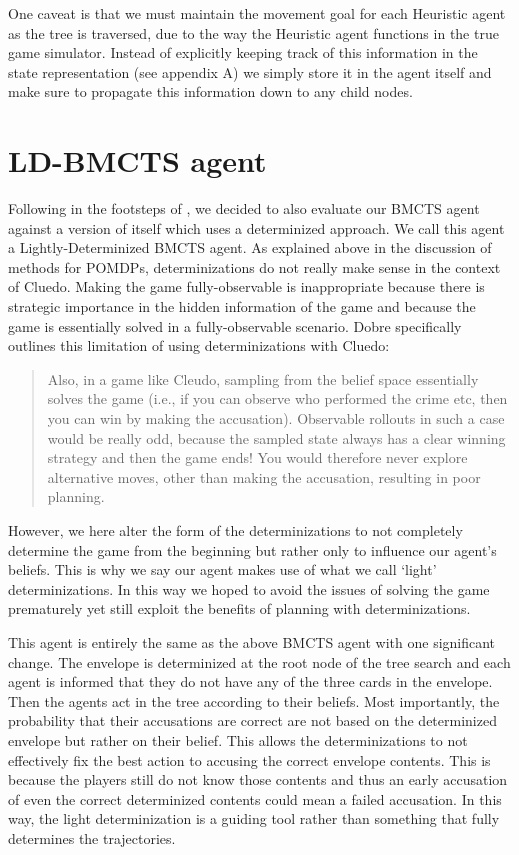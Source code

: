 \documentclass[msc, ai, twoside, notimes, logo, parskip, leftchapter, normalheadings]{infthesis}
\begin{document}
One caveat is that we must maintain the movement goal for each Heuristic agent as the tree is traversed, due to the way the Heuristic agent functions in the true game simulator. Instead of explicitly keeping track of this information in the state representation (see appendix A) we simply store it in the agent itself and make sure to propagate this information down to any child nodes.

\section{LD-BMCTS agent}
Following in the footsteps of \citep{Mihai}, we decided to also evaluate our BMCTS agent against a version of itself which uses a determinized approach. We call this agent a Lightly-Determinized BMCTS agent. As explained above in the discussion of methods for POMDPs, determinizations do not really make sense in the context of Cluedo. Making the game fully-observable is inappropriate because there is strategic importance in the hidden information of the game and because the game is essentially solved in a fully-observable scenario. Dobre specifically outlines this limitation of using determinizations with Cluedo:
\begin{quote}
Also, in a game like Cleudo, sampling from the belief space essentially solves the game (i.e., if you can observe who performed the crime etc, then you can win by making the accusation). Observable rollouts in such a case would be really odd, because the sampled state always has a clear winning strategy and then the game ends! You would therefore never explore alternative moves, other than making the accusation, resulting in poor planning. \citep{Mihai}
\end{quote}
However, we here alter the form of the determinizations to not completely determine the game from the beginning but rather only to influence our agent's beliefs. This is why we say our agent makes use of what we call `light' determinizations. In this way we hoped to avoid the issues of solving the game prematurely yet still exploit the benefits of planning with determinizations.

This agent is entirely the same as the above BMCTS agent with one significant change. The envelope is determinized at the root node of the tree search and each agent is informed that they do not have any of the three cards in the envelope. Then the agents act in the tree according to their beliefs. Most importantly, the probability that their accusations are correct are not based on the determinized envelope but rather on their belief. This allows the determinizations to not effectively fix the best action to accusing the correct envelope contents. This is because the players still do not know those contents and thus an early accusation of even the correct determinized contents could mean a failed accusation. In this way, the light determinization is a guiding tool rather than something that fully determines the trajectories.
\end{document}
